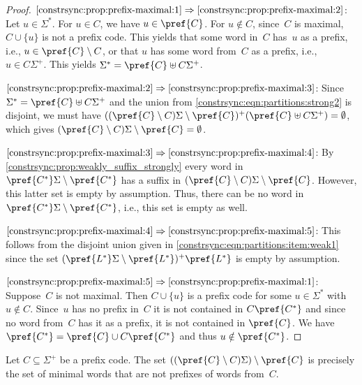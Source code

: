 \begin{proof}
	$\ref{constrsync:prop:prefix-maximal:1} \Rightarrow \ref{constrsync:prop:prefix-maximal:2}$: Let $u \in \Sigma^*$.
	For $u \in C$, we have $u \in \pref{C}$.
	For $u \notin C$,
	since~$C$ is maximal,
	$C \cup \{u\}$ is not a prefix code.
	This yields that some word in~$C$
	has~$u$ as a prefix, i.e., $u \in \pref{C} \setminus C$,
	or that $u$ has some word from~$C$
	as a prefix, i.e., $u \in C\Sigma^+$.
	This yields $\Sigma^* = \pref{C} \uplus C\Sigma^+$.
	
	$\ref{constrsync:prop:prefix-maximal:2} \Rightarrow \ref{constrsync:prop:prefix-maximal:3}$: Since $\Sigma^* = \pref{C} \uplus C\Sigma^+$
	and the union from \cref{constrsync:eqn:partitions:strong2}
	is disjoint,
	we must have $( ( \pref{C} \setminus C )\Sigma \setminus \pref{C})^+ ( \pref{C} \uplus C\Sigma^+ ) = \emptyset$,
	which gives $(\pref{C} \setminus C)\Sigma \setminus \pref{C} = \emptyset$.
	
	$\ref{constrsync:prop:prefix-maximal:3} \Rightarrow \ref{constrsync:prop:prefix-maximal:4}$: By \cref{constrsync:prop:weakly_suffix_strongly} 
	every word in $\pref{C^*}\Sigma  \setminus \pref{C^*}$
	has a suffix in $(\pref{C} \setminus C)\Sigma \setminus \pref{C}$.
	However, this latter set is empty by assumption.
	Thus, there can be no word in $\pref{C^*}\Sigma \setminus \pref{C^*}$, i.e.,
	this set is empty as well.
	
	$\ref{constrsync:prop:prefix-maximal:4} \Rightarrow \ref{constrsync:prop:prefix-maximal:5}$: This follows from the disjoint union given in
	\cref{constrsync:eqn:partitions:item:weak1} since the 
	set $(\pref{L^*}\Sigma \setminus \pref{L^*})^+ \pref{L^*}$
	is empty by assumption.
	
	$\ref{constrsync:prop:prefix-maximal:5} \Rightarrow \ref{constrsync:prop:prefix-maximal:1}$: Suppose~$C$ is not maximal.
	Then $C \cup \{u\}$ is a prefix code for some $u \in \Sigma^*$
	with $u \notin C$.
	Since~$u$ has no prefix in~$C$ it is not contained in $C\pref{C^*}$
	and since no word from~$C$ has it as a prefix,
	it is not contained in $\pref{C}$.
	We have $\pref{C^*} = \pref{C} \cup C\pref{C^*}$
	and thus $u \notin \pref{C^*}$.
\end{proof}

\begin{remark}
	Let $C \subseteq \Sigma^+$ be a prefix code.
	The set $( (\pref{C} \setminus C)\Sigma ) \setminus \pref{C}$
	is precisely the set of minimal words
	that are not prefixes of words from~$C$.
\end{remark}

